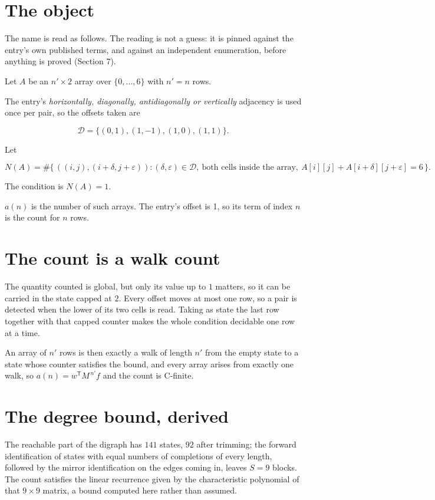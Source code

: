 \documentclass[11pt]{article}
\theoremstyle{definition}
\begin{document}
\section{The object}

The name is read as follows. The reading is not a guess: it is pinned against the entry's own published terms, and against an independent enumeration, before anything is proved (Section 7).

Let $A$ be an $n' \times 2$ array over $\{0,\dots,6\}$ with $n' = n$ rows.

The entry's {\itshape horizontally, diagonally, antidiagonally or vertically} adjacency is used once per pair, so the offsets taken are

\[\mathcal{D} = \{(0,1), (1,-1), (1,0), (1,1)\}.\]

Let

\[N(A) = \#\bigl\{\,((i,j),(i{+}\delta,j{+}\varepsilon)) : (\delta,\varepsilon) \in \mathcal{D},\ \text{both cells inside the array},\ A[i][j] + A[i{+}\delta][j{+}\varepsilon] = 6\,\bigr\}.\]

The condition is $N(A) = 1$.

$a(n)$ is the number of such arrays. The entry's offset is 1, so its term of index $n$ is the count for $n$ rows.

\section{The count is a walk count}

The quantity counted is global, but only its value up to $1$ matters, so it can be carried in the state capped at $2$. Every offset moves at most one row, so a pair is detected when the lower of its two cells is read. Taking as state the last row together with that capped counter makes the whole condition decidable one row at a time.

An array of $n'$ rows is then exactly a walk of length $n'$ from the empty state to a state whose counter satisfies the bound, and every array arises from exactly one walk, so $a(n) = w^{\mathsf T}M^{\,n'}f$ and the count is C-finite.

\section{The degree bound, derived}

The reachable part of the digraph has $141$ states, $92$ after trimming; the forward identification of states with equal numbers of completions of every length, followed by the mirror identification on the edges coming in, leaves $S = 9$ blocks. The count satisfies the linear recurrence given by the characteristic polynomial of that $9\times9$ matrix, a bound computed here rather than assumed.
\end{document}
